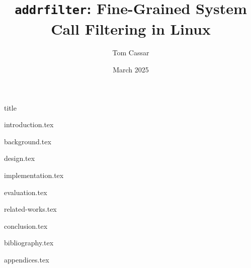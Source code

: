 \documentclass[fontsize=14pt]{article}
\title{\texttt{addrfilter}: Fine-Grained System Call Filtering in Linux}
\author{Tom Cassar}
\date{March 2025}
\begin{document}
\maketitle

%

\clearpage

{title}

\clearpage

{introduction.tex}

\clearpage

{background.tex}

\clearpage

{design.tex}

\clearpage

{implementation.tex}

\clearpage

{evaluation.tex}

\clearpage

{related-works.tex}

\clearpage

{conclusion.tex}

\clearpage

{bibliography.tex}

\clearpage

{appendices.tex}
\end{document}
